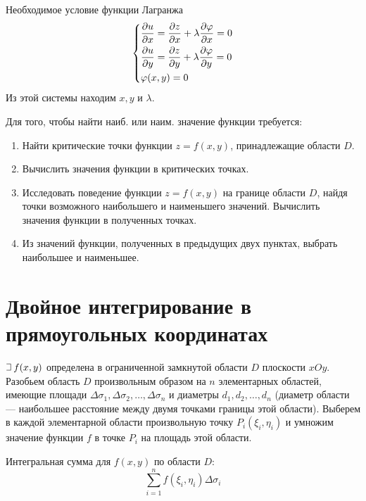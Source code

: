 \documentclass[a4paper,12pt,oneside]{extbook}
\def\lets{%
    \mathord{\setbox0=\hbox{$\exists$}%
        \hbox{\kern 0.125\wd0%
            \vbox to \ht0{%
                \hrule width 0.75\wd0%
                \vfill%
                \hrule width 0.75\wd0}%
            \vrule height \ht0%
            \kern 0.125\wd0}%
    }%
    \hspace{2pt}
}
\theoremstyle{numbered}
\theoremstyle{unnumbered}
\theoremstyle{named}
\theoremstyle{unnumbered}
\theoremstyle{named}
\theoremstyle{named}
\theoremstyle{named}
\begin{document}
Необходимое условие функции Лагранжа
\begin{equation}
    \begin{dcases*}
        \frac{\partial u}{\partial x} = \frac{\partial z}{\partial x} + \lambda \frac{\partial \varphi}{\partial x} = 0 \\
        \frac{\partial u}{\partial y} = \frac{\partial z}{\partial y} + \lambda \frac{\partial \varphi}{\partial y} = 0 \\
        \varphi(x, y) = 0
    \end{dcases*}
\end{equation}
Из этой системы находим \(x, y\) и \(\lambda\).

Для того, чтобы найти наиб. или наим. значение функции требуется:
\begin{enumerate}
    \item Найти критические точки функции \(z = f(x, y)\), принадлежащие области \(D\).
    \item Вычислить значения функции в критических точках.
    \item Исследовать поведение функции \(z = f(x, y)\) на границе области \(D\), найдя точки возможного наибольшего и наименьшего значений. Вычислить значения функции в полученных точках.
    \item Из значений функции, полученных в предыдущих двух пунктах, выбрать наибольшее и наименьшее.
\end{enumerate}


\section{Двойное интегрирование в прямоугольных координатах}%
\label{sec:Двойное интегрирование в прямоугольных координатах}

\(\lets f(x, y)\) определена в ограниченной замкнутой области \(D\) плоскости \(xOy\). Разобьем область \(D\) произвольным образом на \(n\) элементарных областей, имеющие площади \(\Delta \sigma_1, \Delta \sigma_2, \ldots, \Delta \sigma_n\) и диаметры \(d_1, d_2, \ldots, d_n\) (диаметр области — наибольшее расстояние между двумя точками границы этой области). Выберем в каждой элементарной области произвольную точку \(P_i (\xi_i, \eta_i)\) и умножим значение функции \(f\) в точке \(P_i\) на площадь этой области.

Интегральная сумма для \(f(x, y)\) по области \(D\):
\begin{equation}
    \sum_{i=1}^n f(\xi_i, \eta_i) \Delta \sigma_i
\end{equation}
\end{document}
